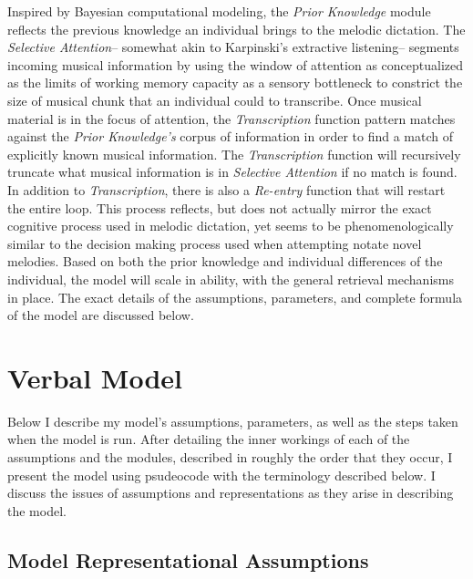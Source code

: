 \documentclass[]{book}
\theoremstyle{definition}
\theoremstyle{definition}
\theoremstyle{definition}
\theoremstyle{remark}
\begin{document}
Inspired by Bayesian computational modeling, the \emph{Prior Knowledge}
module reflects the previous knowledge an individual brings to the
melodic dictation. The \emph{Selective Attention}-- somewhat akin to
Karpinski's extractive listening-- segments incoming musical information
by using the window of attention as conceptualized as the limits of
working memory capacity as a sensory bottleneck to constrict the size of
musical chunk that an individual could to transcribe. Once musical
material is in the focus of attention, the \emph{Transcription} function
pattern matches against the \emph{Prior Knowledge's} corpus of
information in order to find a match of explicitly known musical
information. The \emph{Transcription} function will recursively truncate
what musical information is in \emph{Selective Attention} if no match is
found. In addition to \emph{Transcription}, there is also a
\emph{Re-entry} function that will restart the entire loop. This process
reflects, but does not actually mirror the exact cognitive process used
in melodic dictation, yet seems to be phenomenologically similar to the
decision making process used when attempting notate novel melodies.
Based on both the prior knowledge and individual differences of the
individual, the model will scale in ability, with the general retrieval
mechanisms in place. The exact details of the assumptions, parameters,
and complete formula of the model are discussed below.

\hypertarget{verbal-model}{%
\section{Verbal Model}\label{verbal-model}}

Below I describe my model's assumptions, parameters, as well as the
steps taken when the model is run. After detailing the inner workings of
each of the assumptions and the modules, described in roughly the order
that they occur, I present the model using psudeocode with the
terminology described below. I discuss the issues of assumptions and
representations as they arise in describing the model.

\hypertarget{model-representational-assumptions}{%
\subsection{Model Representational
Assumptions}\label{model-representational-assumptions}}
\end{document}
